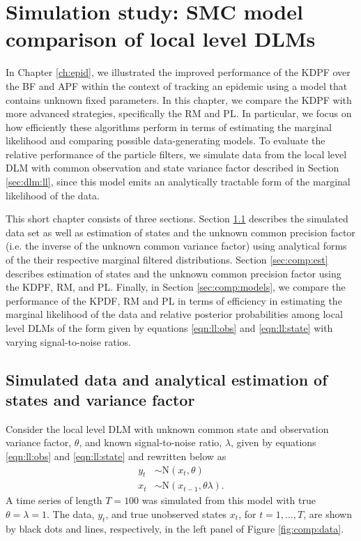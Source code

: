 \chapter{Simulation study: SMC model comparison of local level DLMs \label{ch:comp}}

In Chapter \ref{ch:epid}, we illustrated the improved performance of the KDPF over the BF and APF within the context of tracking an epidemic using a model that contains unknown fixed parameters. In this chapter, we compare the KDPF with more advanced strategies, specifically the RM and PL. In particular, we focus on how efficiently these algorithms perform in terms of estimating the marginal likelihood and comparing possible data-generating models. To evaluate the relative performance of the particle filters, we simulate data from the local level DLM with common observation and state variance factor described in Section \ref{sec:dlm:ll}, since this model emits an analytically tractable form of the marginal likelihood of the data.

This short chapter consists of three sections. Section \ref{sec:comp:data} describes the simulated data set as well as estimation of states and the unknown common precision factor (i.e. the inverse of the unknown common variance factor) using analytical forms of the their respective marginal filtered distributions. Section \ref{sec:comp:est} describes estimation of states and the unknown common precision factor using the KDPF, RM, and PL. Finally, in Section \ref{sec:comp:models}, we compare the performance of the KPDF, RM and PL in terms of efficiency in estimating the marginal likelihood of the data and relative posterior probabilities among local level DLMs of the form given by equations \eqref{eqn:ll:obs} and \eqref{eqn:ll:state} with varying signal-to-noise ratios.

\section{Simulated data and analytical estimation of states and variance factor} \label{sec:comp:data}

Consider the local level DLM with unknown common state and observation variance factor, $\theta$, and known signal-to-noise ratio, $\lambda$, given by equations \eqref{eqn:ll:obs} and \eqref{eqn:ll:state} and rewritten below as
\begin{align*}
y_t &\sim \mbox{N}(x_t, \theta) \\
x_t &\sim \mbox{N}(x_{t-1}, \theta\lambda).
\end{align*}
A time series of length $T = 100$ was simulated from this model with true $\theta = \lambda = 1$. The data, $y_t$, and true unobserved states $x_t$, for $t=1,\ldots,T$, are shown by black dots and lines, respectively, in the left panel of Figure \ref{fig:comp:data}.

